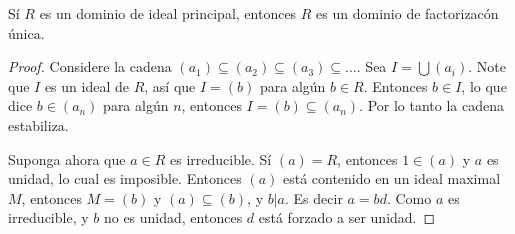 \begin{theorem}\label{16.70}
    S\'i $R$ es un dominio de ideal principal, entonces  $R$ es un dominio de
    factorizac\'on \'unica.
\end{theorem}
\begin{proof}
    Considere la cadena $(a_1) \subseteq (a_2) \subseteq (a_3) \subseteq \dots$.
    Sea $I=\bigcup{(a_i)}$. Note que $I$ es un ideal de $R$, as\'i que $I=(b)$
    para alg\'un $b \in R$. Entonces  $b \in I$, lo que dice $b \in (a_n)$ para
    alg\'un $n$, entonces  $I=(b) \subseteq (a_n)$. Por lo tanto la cadena
    estabiliza.

    Suponga ahora que $a \in R$ es irreducible. S\'i $(a)=R$, entonces $1 \in
    (a)$ y $a$ es unidad, lo cual es imposible. Entonces $(a)$ est\'a contenido
    en un ideal maximal $M$, entonces $M=(b)$ y $(a) \subseteq (b)$, y $b|a$. Es
    decir  $a=bd$. Como $a$ es irreducible, y  $b$ no es unidad, entonces $d$
    est\'a forzado a ser unidad.
\end{proof}
